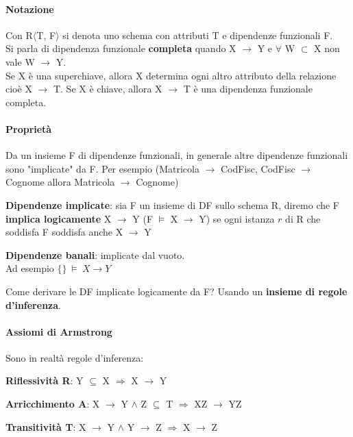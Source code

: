 \documentclass[10pt]{book}
\begin{document}
\paragraph{Notazione} Con R$\langle$T, F$\rangle$ si denota uno schema con attributi T e dipendenze funzionali F.\\
Si parla di dipendenza funzionale \textbf{completa} quando X $\rightarrow$ Y e $\forall$ W $\subset$ X non vale W $\rightarrow$ Y.\\
Se X è una superchiave, allora X determina ogni altro attributo della relazione cioè X $\rightarrow$ T. Se X è chiave, allora X $\rightarrow$ T è una dipendenza funzionale completa.
\paragraph{Proprietà} Da un insieme F di dipendenze funzionali, in generale altre dipendenze funzionali sono "implicate" da F. Per esempio (Matricola $\rightarrow$ CodFisc, CodFisc $\rightarrow$ Cognome allora Matricola $\rightarrow$ Cognome)
\begin{list}{}{}
	\item \textbf{Dipendenze implicate}: sia F un insieme di DF sullo schema R, diremo che F \textbf{implica logicamente} X $\rightarrow$ Y (F $\vDash$ X $\rightarrow$ Y) se ogni istanza $r$ di R che soddisfa F soddisfa anche X $\rightarrow$ Y
	\item \textbf{Dipendenze banali}: implicate dal vuoto.\\
	Ad esempio $\{\}\:\vDash\:X \rightarrow Y$
\end{list}
Come derivare le DF implicate logicamente da F? Usando un \textbf{insieme di regole d'inferenza}.
\paragraph{Assiomi di Armstrong} Sono in realtà regole d'inferenza:
\begin{list}{}{}
	\item \textbf{Riflessività R}: Y $\subseteq$ X $\Rightarrow$ X $\rightarrow$ Y
	\item \textbf{Arricchimento A}: X $\rightarrow$ Y $\wedge$ Z $\subseteq$ T $\Rightarrow$ XZ $\rightarrow$ YZ
	\item \textbf{Transitività T}: X $\rightarrow$ Y $\wedge$ Y $\rightarrow$ Z $\Rightarrow$ X $\rightarrow$ Z 
\end{list}
\end{document}
